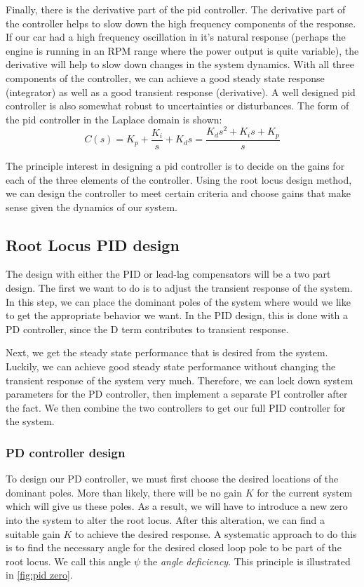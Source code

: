 Finally, there is the derivative part of the \gls{pid} controller. The derivative part of the controller helps to slow down the high frequency components of the response. If our car had a high frequency oscillation in it's natural response (perhaps the engine is running in an RPM range where the power output is quite variable), the derivative will help to slow down changes in the system dynamics. With all three components of the controller, we can achieve a good steady state response (integrator) as well as a good transient response (derivative). A well designed \gls{pid} controller is also somewhat robust to uncertainties or disturbances. The form of the \gls{pid} controller in the Laplace domain is shown:
$$C(s)=K_p+\frac{K_i}{s}+K_ds=\frac{K_ds^2+K_is+K_p}{s}$$

The principle interest in designing a \gls{pid} controller is to decide on the gains for each of the three elements of the controller. Using the root locus design method, we can design the controller to meet certain criteria and choose gains that make sense given the dynamics of our system.

\subsection{Root Locus PID design}
The design with either the PID or lead-lag compensators will be a two part design. The first we want to do is to adjust the transient response of the system. In this step, we can place the dominant poles of the system where would we like to get the appropriate behavior we want. In the PID design, this is done with a PD controller, since the D term contributes to transient response.

Next, we get the steady state performance that is desired from the system. Luckily, we can achieve good steady state performance without changing the transient response of the system very much. Therefore, we can lock down system parameters for the PD controller, then implement a separate PI controller after the fact. We then combine the two controllers to get our full PID controller for the system.

\subsubsection{PD controller design}
To design our PD controller, we must first choose the desired locations of the dominant poles. More than likely, there will be no gain $K$ for the current system which will give us these poles. As a result, we will have to introduce a new zero into the system to alter the root locus. After this alteration, we can find a suitable gain $K$ to achieve the desired response. A systematic approach to do this is to find the necessary angle for the desired closed loop pole to be part of the root locus. We call this angle $\psi$ the \textit{angle deficiency}. This principle is illustrated in \autoref{fig:pid zero}.

